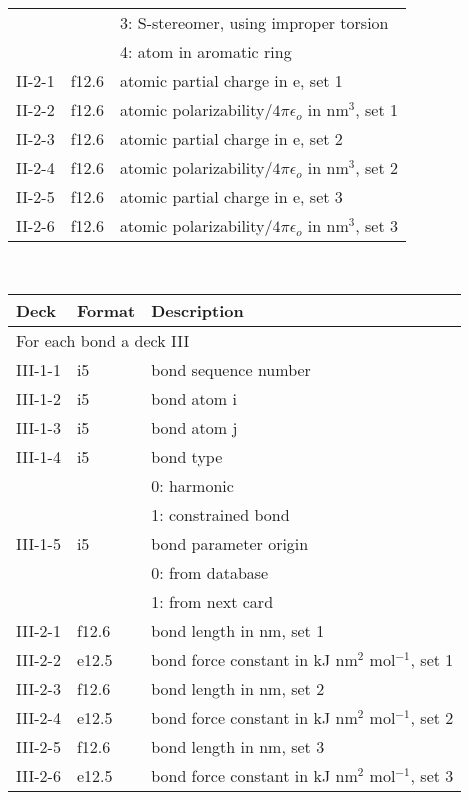 \begin{center}
\begin{tabular*}{150mm}{p{12mm}p{12mm}l}
       &        & 3: S-stereomer, using improper torsion\\
       &        & 4: atom in aromatic ring\\
II-2-1 & f12.6  & atomic partial charge in e, set 1\\
II-2-2 & f12.6  & atomic polarizability/$4\pi\epsilon_o$ in nm$^3$, set 1\\
II-2-3 & f12.6  & atomic partial charge in e, set 2\\
II-2-4 & f12.6  & atomic polarizability/$4\pi\epsilon_o$ in nm$^3$, set 2\\
II-2-5 & f12.6  & atomic partial charge in e, set 3\\
II-2-6 & f12.6  & atomic polarizability/$4\pi\epsilon_o$ in nm$^3$, set 3\\
\hline
\end{tabular*}\\
\begin{tabular*}{150mm}{p{12mm}p{12mm}l}
\hline\hline
Deck & Format & Description \\ \hline
\multicolumn{3}{l}{For each bond a deck III} \\
III-1-1 & i5     & bond sequence number \\
III-1-2 & i5     & bond atom i \\
III-1-3 & i5     & bond atom j \\
III-1-4 & i5     & bond type \\
        &        & 0: harmonic\\
        &        & 1: constrained bond\\
III-1-5 & i5     & bond parameter origin\\
        &        & 0: from database \\
        &        & 1: from next card\\
III-2-1 & f12.6  & bond length in nm, set 1\\
III-2-2 & e12.5  & bond force constant in kJ nm$^2$ mol$^{-1}$, set 1 \\
III-2-3 & f12.6  & bond length in nm, set 2\\
III-2-4 & e12.5  & bond force constant in kJ nm$^2$ mol$^{-1}$, set 2 \\
III-2-5 & f12.6  & bond length in nm, set 3\\
III-2-6 & e12.5  & bond force constant in kJ nm$^2$ mol$^{-1}$, set 3 \\
\hline
\end{tabular*}\\
\begin{tabular*}{150mm}{p{12mm}p{12mm}l}

\end{tabular*}
\end{center}
